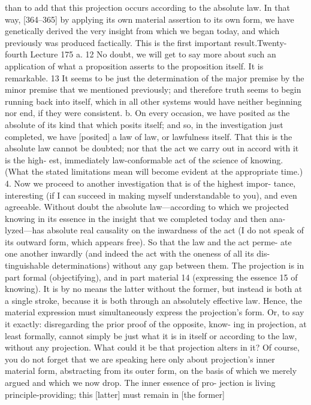 than to add that this projection occurs according to the absolute law. In that
way, [364–365] by applying its own material assertion to its own form, we
have genetically derived the very insight from which we began today, and
which previously was produced factically. This is the first important result.Twenty-fourth Lecture
175
a. 12 No doubt, we will get to say more about such an application of what a
proposition asserts to the proposition itself. It is remarkable. 13 It seems to be
just the determination of the major premise by the minor premise that we
mentioned previously; and therefore truth seems to begin running back into
itself, which in all other systems would have neither beginning nor end, if they
were consistent. b. On every occasion, we have posited as the absolute of its
kind that which posits itself; and so, in the investigation just completed, we
have [posited] a law of law, or lawfulness itself. That this is the absolute law
cannot be doubted; nor that the act we carry out in accord with it is the high-
est, immediately law-conformable act of the science of knowing. (What the
stated limitations mean will become evident at the appropriate time.)
4. Now we proceed to another investigation that is of the highest impor-
tance, interesting (if I can succeed in making myself understandable to you),
and even agreeable.
Without doubt the absolute law—according to which we projected
knowing in its essence in the insight that we completed today and then ana-
lyzed—has absolute real causality on the inwardness of the act (I do not speak
of its outward form, which appears free). So that the law and the act perme-
ate one another inwardly (and indeed the act with the oneness of all its dis-
tinguishable determinations) without any gap between them. The projection
is in part formal (objectifying), and in part material 14 (expressing the essence 15
of knowing). It is by no means the latter without the former, but instead is
both at a single stroke, because it is both through an absolutely effective law.
Hence, the material expression must simultaneously express the projection’s
form. Or, to say it exactly: disregarding the prior proof of the opposite, know-
ing in projection, at least formally, cannot simply be just what it is in itself or
according to the law, without any projection. What could it be that projection
alters in it? Of course, you do not forget that we are speaking here only about
projection’s inner material form, abstracting from its outer form, on the basis
of which we merely argued and which we now drop. The inner essence of pro-
jection is living principle-providing; this [latter] must remain in [the former]
